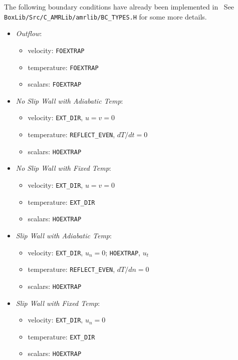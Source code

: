 The following boundary conditions have already been implemented in
\castro\ See {\tt BoxLib/Src/C\_AMRLib/amrlib/BC\_TYPES.H} for some
more details.
\begin{itemize}
\item {\it Outflow}:
  \begin{itemize}
    \item velocity: {\tt FOEXTRAP}
    \item temperature: {\tt FOEXTRAP}
    \item scalars: {\tt FOEXTRAP}
  \end{itemize}
  
\item {\it No Slip Wall with Adiabatic Temp}:
  \begin{itemize}
  \item velocity: {\tt EXT\_DIR}, $u=v=0$
  \item temperature: {\tt REFLECT\_EVEN}, $dT/dt=0$
  \item scalars: {\tt HOEXTRAP}
  \end{itemize}

\item {\it No Slip Wall with Fixed Temp}:
  \begin{itemize}
  \item velocity: {\tt EXT\_DIR}, $u=v=0$
  \item temperature: {\tt EXT\_DIR}
  \item scalars: {\tt HOEXTRAP}
  \end{itemize}
    
\item {\it Slip Wall with Adiabatic Temp}:
  \begin{itemize}
  \item velocity: {\tt EXT\_DIR}, $u_n=0$; {\tt HOEXTRAP}, $u_t$
  \item temperature: {\tt REFLECT\_EVEN}, $dT/dn=0$
  \item scalars: {\tt HOEXTRAP}
  \end{itemize}
  
\item {\it Slip Wall with Fixed Temp}:
  \begin{itemize}
  \item velocity: {\tt EXT\_DIR}, $u_n=0$
  \item temperature: {\tt EXT\_DIR}
  \item scalars: {\tt HOEXTRAP}
  \end{itemize}

\end{itemize}

